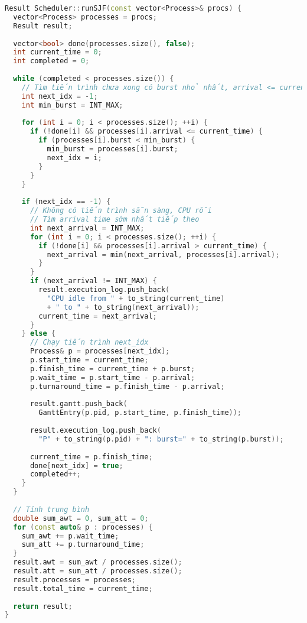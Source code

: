\begin{lstlisting}[language=C++,caption={Cài đặt SJF}]
Result Scheduler::runSJF(const vector<Process>& procs) {
  vector<Process> processes = procs;
  Result result;
  
  vector<bool> done(processes.size(), false);
  int current_time = 0;
  int completed = 0;
  
  while (completed < processes.size()) {
    // Tìm tiến trình chưa xong có burst nhỏ nhất, arrival <= current_time
    int next_idx = -1;
    int min_burst = INT_MAX;
    
    for (int i = 0; i < processes.size(); ++i) {
      if (!done[i] && processes[i].arrival <= current_time) {
        if (processes[i].burst < min_burst) {
          min_burst = processes[i].burst;
          next_idx = i;
        }
      }
    }
    
    if (next_idx == -1) {
      // Không có tiến trình sẵn sàng, CPU rỗi
      // Tìm arrival time sớm nhất tiếp theo
      int next_arrival = INT_MAX;
      for (int i = 0; i < processes.size(); ++i) {
        if (!done[i] && processes[i].arrival > current_time) {
          next_arrival = min(next_arrival, processes[i].arrival);
        }
      }
      if (next_arrival != INT_MAX) {
        result.execution_log.push_back(
          "CPU idle from " + to_string(current_time) 
          + " to " + to_string(next_arrival));
        current_time = next_arrival;
      }
    } else {
      // Chạy tiến trình next_idx
      Process& p = processes[next_idx];
      p.start_time = current_time;
      p.finish_time = current_time + p.burst;
      p.wait_time = p.start_time - p.arrival;
      p.turnaround_time = p.finish_time - p.arrival;
      
      result.gantt.push_back(
        GanttEntry(p.pid, p.start_time, p.finish_time));
      
      result.execution_log.push_back(
        "P" + to_string(p.pid) + ": burst=" + to_string(p.burst));
      
      current_time = p.finish_time;
      done[next_idx] = true;
      completed++;
    }
  }
  
  // Tính trung bình
  double sum_awt = 0, sum_att = 0;
  for (const auto& p : processes) {
    sum_awt += p.wait_time;
    sum_att += p.turnaround_time;
  }
  result.awt = sum_awt / processes.size();
  result.att = sum_att / processes.size();
  result.processes = processes;
  result.total_time = current_time;
  
  return result;
}
\end{lstlisting}

